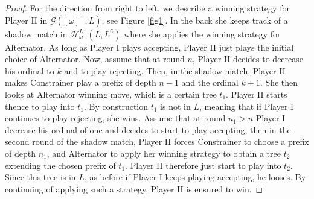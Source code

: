 \begin{proof}
For the direction from right to left, we describe a winning strategy for Player II in $\mathcal{G}([\omega]^+, L)$, see Figure \ref{fig1}. In the back she keeps track of a shadow match in $\mathcal{H}^{L^+}_\omega(L, L^\complement)$ where she applies the  winning strategy for Alternator. 
As long as Player I plays accepting, Player II just plays the initial choice of Alternator. Now, assume that at round $n$, Player II decides to decrease his ordinal to $k$ and to play rejecting. Then, in the shadow match, Player II makes Constrainer play a prefix of depth $n-1$ and the ordinal $k+1$. She then looks at Alternator winning move, which is a certain tree $t_1$. Player II starts thence to play into $t_1$. By construction $t_1$ is not in $L$, meaning that if Player I continues to play rejecting, she wins. Assume that at round $n_1> n$ Player I decrease his ordinal of one and decides to start to play accepting, then in the second round of the shadow match, Player II forces Constrainer to choose a prefix of depth $n_1$, and Alternator to apply her winning strategy to obtain a tree $t_2$ extending the chosen prefix of $t_1$. Player II therefore just start to play into $t_2$. Since this tree is in $L$, as before if Player I keeps playing accepting, he looses. By continuing of applying such a strategy, Player II is ensured to win. 
\end{proof}


